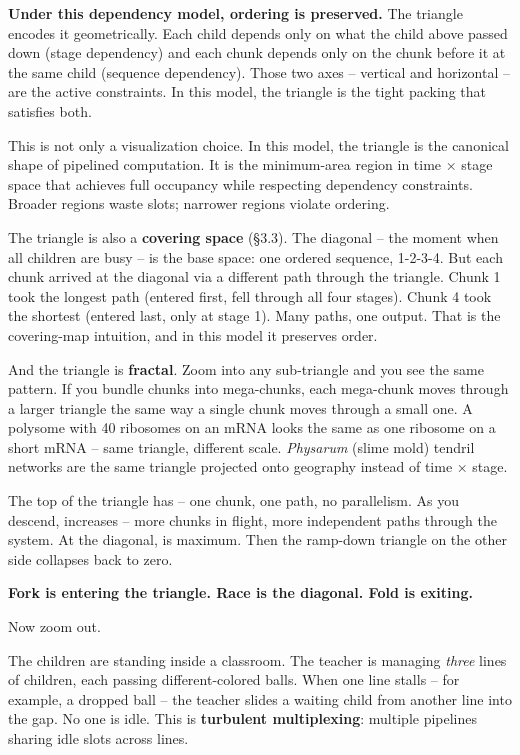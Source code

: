 \documentclass[
]{article}
\begin{document}
\textbf{Under this dependency model, ordering is preserved.} The
triangle encodes it geometrically. Each child depends only on what the
child above passed down (stage dependency) and each chunk depends only
on the chunk before it at the same child (sequence dependency). Those
two axes -- vertical and horizontal -- are the active constraints. In
this model, the triangle is the tight packing that satisfies both.

This is not only a visualization choice. In this model, the triangle is
the canonical shape of pipelined computation. It is the minimum-area
region in time × stage space that achieves full occupancy while
respecting dependency constraints. Broader regions waste slots; narrower
regions violate ordering.

The triangle is also a \textbf{covering space} (§3.3). The diagonal --
the moment when all children are busy -- is the base space: one ordered
sequence, 1-2-3-4. But each chunk arrived at the diagonal via a
different path through the triangle. Chunk 1 took the longest path
(entered first, fell through all four stages). Chunk 4 took the shortest
(entered last, only at stage 1). Many paths, one output. That is the
covering-map intuition, and in this model it preserves order.

And the triangle is \textbf{fractal}. Zoom into any sub-triangle and you
see the same pattern. If you bundle chunks into mega-chunks, each
mega-chunk moves through a larger triangle the same way a single chunk
moves through a small one. A polysome with 40 ribosomes on an mRNA looks
the same as one ribosome on a short mRNA -- same triangle, different
scale. \emph{Physarum} (slime mold) tendril networks are the same
triangle projected onto geography instead of time × stage.

The top of the triangle has -- one chunk, one path, no parallelism. As
you descend, increases -- more chunks in flight, more independent paths
through the system. At the diagonal, is maximum. Then the ramp-down
triangle on the other side collapses back to zero.

\textbf{Fork is entering the triangle. Race is the diagonal. Fold is
exiting.}

Now zoom out.

The children are standing inside a classroom. The teacher is managing
\emph{three} lines of children, each passing different-colored balls.
When one line stalls -- for example, a dropped ball -- the teacher
slides a waiting child from another line into the gap. No one is idle.
This is \textbf{turbulent multiplexing}: multiple pipelines sharing idle
slots across lines.
\end{document}
